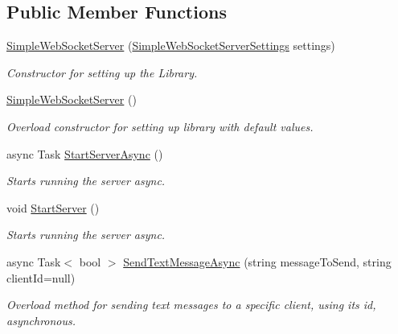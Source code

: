 \subsection*{Public Member Functions}
\begin{DoxyCompactItemize}
\item 
\mbox{\hyperlink{class_simple_web_socket_server_library_1_1_simple_web_socket_server_af3cde755fdb2781292c27174161508ed}{Simple\+Web\+Socket\+Server}} (\mbox{\hyperlink{class_simple_web_socket_server_library_1_1_simple_web_socket_server_settings}{Simple\+Web\+Socket\+Server\+Settings}} settings)
\begin{DoxyCompactList}\small\item\em Constructor for setting up the Library. \end{DoxyCompactList}\item 
\mbox{\hyperlink{class_simple_web_socket_server_library_1_1_simple_web_socket_server_adb600b8e26bb7a91c7e8a196de1c3c68}{Simple\+Web\+Socket\+Server}} ()
\begin{DoxyCompactList}\small\item\em Overload constructor for setting up library with default values. \end{DoxyCompactList}\item 
async Task \mbox{\hyperlink{class_simple_web_socket_server_library_1_1_simple_web_socket_server_a14730d592f2fdd3278a8df1403ebd672}{Start\+Server\+Async}} ()
\begin{DoxyCompactList}\small\item\em Starts running the server async. \end{DoxyCompactList}\item 
void \mbox{\hyperlink{class_simple_web_socket_server_library_1_1_simple_web_socket_server_ad354c38a3f5583fe213ab913085c320a}{Start\+Server}} ()
\begin{DoxyCompactList}\small\item\em Starts running the server async. \end{DoxyCompactList}\item 
async Task$<$ bool $>$ \mbox{\hyperlink{class_simple_web_socket_server_library_1_1_simple_web_socket_server_aefe75fd888dea52bd64108dd03abed61}{Send\+Text\+Message\+Async}} (string message\+To\+Send, string client\+Id=null)
\begin{DoxyCompactList}\small\item\em Overload method for sending text messages to a specific client, using it\textquotesingle{}s id, asynchronous. \end{DoxyCompactList}\item 

\end{DoxyCompactItemize}
